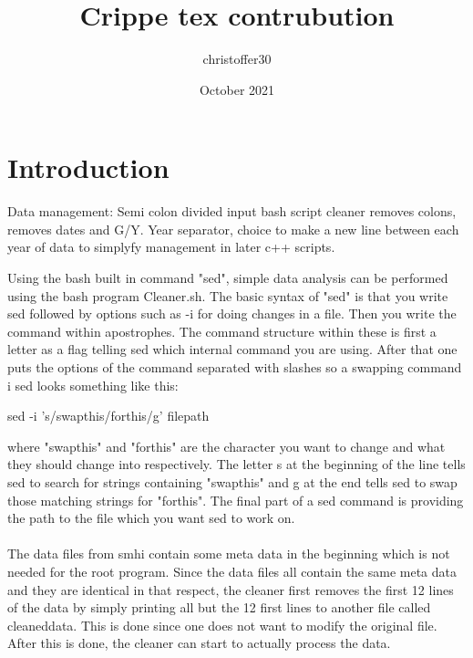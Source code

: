 \documentclass{article}
\title{Crippe tex contrubution}
\author{christoffer30 }
\date{October 2021}
\begin{document}
\maketitle

\section{Introduction}
Data management:
Semi colon divided input
bash script cleaner removes colons, removes dates and G/Y.
Year separator, choice to make a new line between each year of data to simplyfy management in later c++ scripts. 

Using the bash built in command "sed", simple data analysis can be performed using the bash program Cleaner.sh. The basic syntax of "sed" is that you write sed followed by options such as -i for doing changes in a file. Then you write the command within apostrophes. The command structure within these is first a letter as a flag telling sed which internal command you are using. After that one puts the options of the command separated with slashes so a swapping command i sed looks something like this:
\begin{center}
    sed -i 's/swapthis/forthis/g' filepath
\end{center}
where "swapthis" and "forthis" are the character you want to change and what they should change into respectively. The letter s at the beginning of the line tells sed to search for strings containing "swapthis" and g at the end tells sed to swap those matching strings for "forthis". The final part of a sed command is providing the path to the file which you want sed to work on.\\\\
The data files from smhi contain some meta data in the beginning which is not needed for the root program. Since the data files all contain the same meta data and they are identical in that respect, the cleaner first removes the first 12 lines of the data by simply printing all but the 12 first lines to another file called cleaneddata. This is done since one does not want to modify the original file. After this is done, the cleaner can start to actually process the data.\\\\
\end{document}
